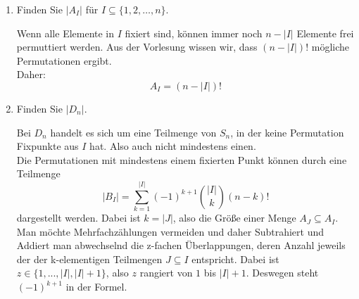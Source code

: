 \documentclass{article} %
\begin{document}
\begin{enumerate}
    \item[(a)] Finden Sie $|A_I|$ für $I \subseteq \{1, 2, \dots, n\}$. 
\begin{mybox}
    Wenn alle Elemente in $I$ fixiert sind, können immer noch $n - |I|$ Elemente frei permuttiert werden. Aus der Vorlesung wissen wir, dass $(n - |I|)!$ mögliche Permutationen ergibt. \\
    Daher: 
    \[
        A_I = (n - |I|)!
    \]
\end{mybox}
    \item[(b)] Finden Sie $|D_n|$.
\begin{mybox}
    Bei $D_n$ handelt es sich um eine Teilmenge von $S_n$, in der keine Permutation Fixpunkte aus $I$ hat. Also auch nicht mindestens einen.  \\
    Die Permutationen mit mindestens einem fixierten Punkt können durch eine Teilmenge 
    \[
       |B_I| = \sum_{k=1}^{|I|} (-1)^{k+1} \binom{|I|}{k} (n - k)! 
    \] 
    dargestellt werden. 
    Dabei ist $k = |J|$, also die Größe einer Menge $A_J \subseteq A_I$. \\
    Man möchte Mehrfachzählungen vermeiden und daher Subtrahiert und Addiert man abwechselnd die z-fachen Überlappungen, deren Anzahl jeweils der der k-elementigen Teilmengen $J \subseteq I$ entspricht. Dabei ist $z \in \{1, ..., |I|, |I|+1\}$, also $z$ rangiert von $1$ bis $|I|+1$. Deswegen steht $(-1)^{k+1}$ in der Formel. \\

\end{mybox}
\end{enumerate}
\end{document}
